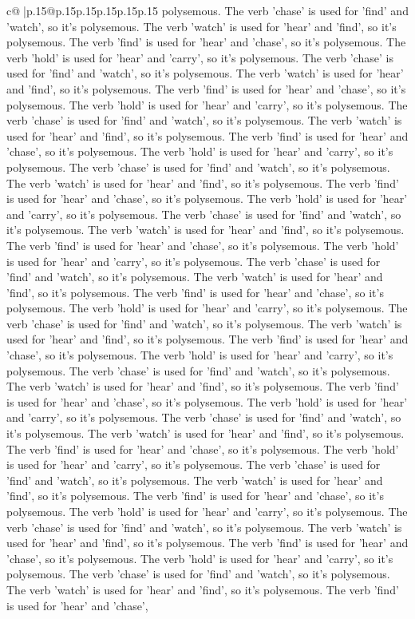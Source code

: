 \documentclass{article}
\begin{document}
{\begin{supertabular}{c@{$\;$}|p{.15\linewidth}@{}p{.15\linewidth}p{.15\linewidth}p{.15\linewidth}p{.15\linewidth}p{.15\linewidth}}
{{{polysemous. The verb 'chase' is used for 'find' and 'watch', so it's polysemous. The verb 'watch' is used for 'hear' and 'find', so it's polysemous. The verb 'find' is used for 'hear' and 'chase', so it's polysemous. The verb 'hold' is used for 'hear' and 'carry', so it's polysemous. The verb 'chase' is used for 'find' and 'watch', so it's polysemous. The verb 'watch' is used for 'hear' and 'find', so it's polysemous. The verb 'find' is used for 'hear' and 'chase', so it's polysemous. The verb 'hold' is used for 'hear' and 'carry', so it's polysemous. The verb 'chase' is used for 'find' and 'watch', so it's polysemous. The verb 'watch' is used for 'hear' and 'find', so it's polysemous. The verb 'find' is used for 'hear' and 'chase', so it's polysemous. The verb 'hold' is used for 'hear' and 'carry', so it's polysemous. The verb 'chase' is used for 'find' and 'watch', so it's polysemous. The verb 'watch' is used for 'hear' and 'find', so it's polysemous. The verb 'find' is used for 'hear' and 'chase', so it's polysemous. The verb 'hold' is used for 'hear' and 'carry', so it's polysemous. The verb 'chase' is used for 'find' and 'watch', so it's polysemous. The verb 'watch' is used for 'hear' and 'find', so it's polysemous. The verb 'find' is used for 'hear' and 'chase', so it's polysemous. The verb 'hold' is used for 'hear' and 'carry', so it's polysemous. The verb 'chase' is used for 'find' and 'watch', so it's polysemous. The verb 'watch' is used for 'hear' and 'find', so it's polysemous. The verb 'find' is used for 'hear' and 'chase', so it's polysemous. The verb 'hold' is used for 'hear' and 'carry', so it's polysemous. The verb 'chase' is used for 'find' and 'watch', so it's polysemous. The verb 'watch' is used for 'hear' and 'find', so it's polysemous. The verb 'find' is used for 'hear' and 'chase', so it's polysemous. The verb 'hold' is used for 'hear' and 'carry', so it's polysemous. The verb 'chase' is used for 'find' and 'watch', so it's polysemous. The verb 'watch' is used for 'hear' and 'find', so it's polysemous. The verb 'find' is used for 'hear' and 'chase', so it's polysemous. The verb 'hold' is used for 'hear' and 'carry', so it's polysemous. The verb 'chase' is used for 'find' and 'watch', so it's polysemous. The verb 'watch' is used for 'hear' and 'find', so it's polysemous. The verb 'find' is used for 'hear' and 'chase', so it's polysemous. The verb 'hold' is used for 'hear' and 'carry', so it's polysemous. The verb 'chase' is used for 'find' and 'watch', so it's polysemous. The verb 'watch' is used for 'hear' and 'find', so it's polysemous. The verb 'find' is used for 'hear' and 'chase', so it's polysemous. The verb 'hold' is used for 'hear' and 'carry', so it's polysemous. The verb 'chase' is used for 'find' and 'watch', so it's polysemous. The verb 'watch' is used for 'hear' and 'find', so it's polysemous. The verb 'find' is used for 'hear' and 'chase', so it's polysemous. The verb 'hold' is used for 'hear' and 'carry', so it's polysemous. The verb 'chase' is used for 'find' and 'watch', so it's polysemous. The verb 'watch' is used for 'hear' and 'find', so it's polysemous. The verb 'find' is used for 'hear' and 'chase', }}}
\end{supertabular}}
\end{document}
